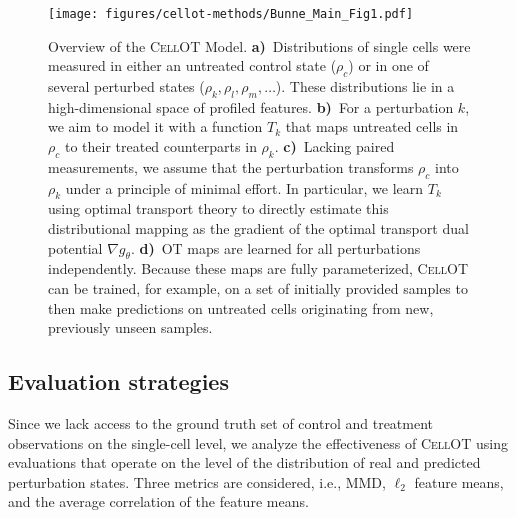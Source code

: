 \begin{figure}
  \begin{center}
  \texttt{[image: figures/cellot-methods/Bunne\_Main\_Fig1.pdf]}
  \end{center}
  \caption{Overview of the \textsc{CellOT} Model. \textbf{a)}~Distributions of single cells were measured in either an untreated control state ($\rho_c$) or in one of several perturbed states ($\rho_k, \rho_l, \rho_m,  \ldots$). These distributions lie in a high-dimensional space of profiled features. \textbf{b)}~For a perturbation $k$, we aim to model it with a function $T_k$ that maps untreated cells in $\rho_c$ to their treated counterparts in $\rho_k$. \textbf{c)}~Lacking paired measurements, we assume that the perturbation transforms $\rho_c$ into $\rho_k$ under a principle of minimal effort. In particular, we learn $T_k$ using optimal transport theory to directly estimate this distributional mapping as the gradient of the optimal transport dual potential $\nabla g_\theta$.
    \textbf{d)}~OT maps are learned for all perturbations independently. Because these maps are fully parameterized, \textsc{CellOT} can be trained, for example, on a set of initially provided samples to then make predictions on untreated cells originating from new, previously unseen samples.}
  \label{fig:cellot-overview}
\end{figure}

\subsection{Evaluation strategies}
Since we lack access to the ground truth set of control and treatment observations on the single-cell level,
we analyze the effectiveness of \textsc{CellOT} using evaluations that operate on the level of the distribution of real and predicted perturbation states.
Three metrics are considered, i.e., MMD, $\ell_2$ feature means, and the average correlation of the feature means.

